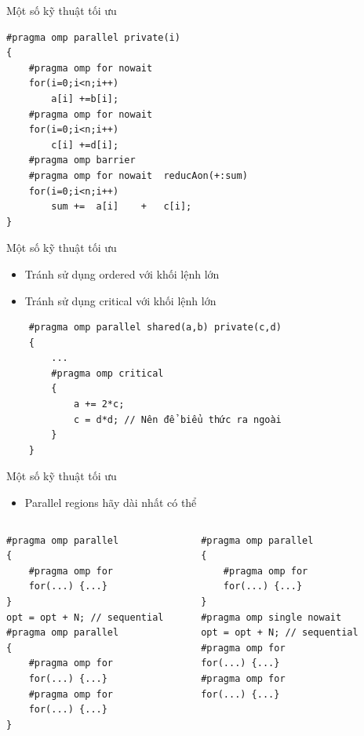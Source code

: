 \documentclass[10pt]{beamer}
\theoremstyle{remark}
\numberwithin{algocf}{section}
\numberwithin{equation}{section}
\numberwithin{dl}{section}
\numberwithin{figure}{section}
\begin{document}
\begin{frame}[fragile]{Một số kỹ thuật tối ưu}
    \begin{verbatim}
#pragma	omp	parallel private(i)	
{	
    #pragma	omp	for	nowait
    for(i=0;i<n;i++)	
        a[i] +=b[i];	
    #pragma	omp	for	nowait
    for(i=0;i<n;i++)	
        c[i] +=d[i];	
    #pragma	omp	barrier	
    #pragma	omp	for	nowait	reducAon(+:sum)	
    for(i=0;i<n;i++)
        sum	+=	a[i]	+	c[i];	
}	
    \end{verbatim}
\end{frame}

\begin{frame}[fragile]{Một số kỹ thuật tối ưu}
    \begin{itemize}
        \item Tránh sử dụng ordered với khối lệnh lớn
        \item Tránh sử dụng critical với khối lệnh lớn
    \end{itemize}
    \begin{verbatim}
    #pragma	omp	parallel shared(a,b) private(c,d)	
    {	
        ...	
        #pragma	omp	critical
        {	
            a += 2*c;	
            c =	d*d; // Nên để biểu thức ra ngoài
        }	
    }	
    \end{verbatim}
\end{frame}

\begin{frame}[fragile]{Một số kỹ thuật tối ưu}
    \begin{itemize}
        \item Parallel regions hãy dài nhất có thể
    \end{itemize}
    \begin{columns}[onlytextwidth]
        \begin{column}{0.5\linewidth}
            \begin{verbatim}
#pragma	omp	parallel		
{	
    #pragma	omp	for	
    for(...) {...}	
}	
opt = opt +	N; // sequential
#pragma	omp	parallel	
{	
    #pragma	omp	for	
    for(...) {...}	
    #pragma	omp	for	
    for(...) {...}	
}    
            \end{verbatim}
        \end{column}
        \begin{column}{0.5\linewidth}
            \begin{verbatim}
#pragma	omp	parallel		
{	
    #pragma	omp	for	
    for(...) {...}	
}
#pragma omp single nowait
opt = opt +	N; // sequential	
#pragma	omp	for	
for(...) {...}	
#pragma	omp	for	
for(...) {...}	
            \end{verbatim}
        \end{column}
    \end{columns}
\end{frame}
\end{document}
